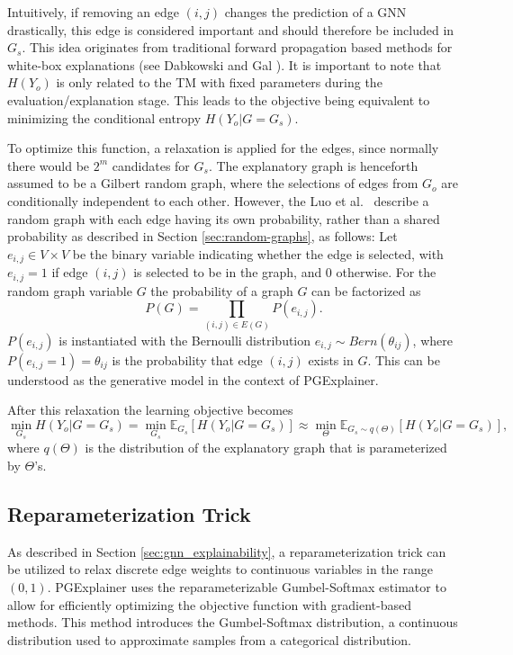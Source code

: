 Intuitively, if removing an edge $(i,j)$ changes the prediction of a GNN drastically, this edge is considered important and should therefore be included in $G_s$. This idea originates from traditional forward propagation based methods for white-box explanations (see Dabkowski and Gal \cite{dabkowski2017real}).
It is important to note that $H(Y_o)$ is only related to the \ac{TM} with fixed parameters during the evaluation/explanation stage. This leads to the objective being equivalent to minimizing the conditional entropy $H(Y_o|G=G_s)$. \bigskip

To optimize this function, a relaxation is applied for the edges, since normally there would be $2^m$ candidates for $G_s$. The explanatory graph is henceforth assumed to be a Gilbert random graph, where the selections of edges from $G_o$ are conditionally independent to each other. However, the Luo et al.~\cite{luo2020parameterized} describe a random graph with each edge having its own probability, rather than a shared probability as described in Section \ref{sec:random-graphs}, as follows: Let $e_{i,j}\in V \times V$ be the binary variable indicating whether the edge is selected, with $e_{i,j} = 1$ if edge $(i,j)$ is selected to be in the graph, and 0 otherwise. For the random graph variable $G$ the probability of a graph $G$ can be factorized as 
\begin{equation}
    P(G) = \prod_{(i,j)\in E(G)}P(e_{i,j}).
\end{equation}
$P(e_{i,j})$ is instantiated with the Bernoulli distribution $e_{i,j} \sim Bern(\theta_{ij})$, where $P(e_{i,j} = 1) = \theta_{ij}$ is the probability that edge $(i,j)$ exists in $G$. This can be understood as the generative model in the context of PGExplainer.

After this relaxation the learning objective becomes
\begin{equation}
    \label{eq:init_learning_obj}
    \min_{G_s}H(Y_o|G = G_s) = \min_{G_s} \mathbb{E}_{G_s}[H(Y_o|G = G_s)] \approx \min_{\Theta} \mathbb{E}_{G_s \sim q(\Theta)}[H(Y_o|G = G_s)],
\end{equation}
where $q(\Theta)$ is the distribution of the explanatory graph that is parameterized by $\Theta$'s.

\subsection{Reparameterization Trick}
\label{sec:Reparameterization_Trick}
As described in Section \ref{sec:gnn_explainability}, a reparameterization trick can be utilized to relax discrete edge weights to continuous variables in the range $(0,1)$. PGExplainer uses the reparameterizable Gumbel-Softmax estimator \cite{jang2016categorical} to allow for efficiently optimizing the objective function with gradient-based methods. This method introduces the Gumbel-Softmax distribution, a continuous distribution used to approximate samples from a categorical distribution. 

